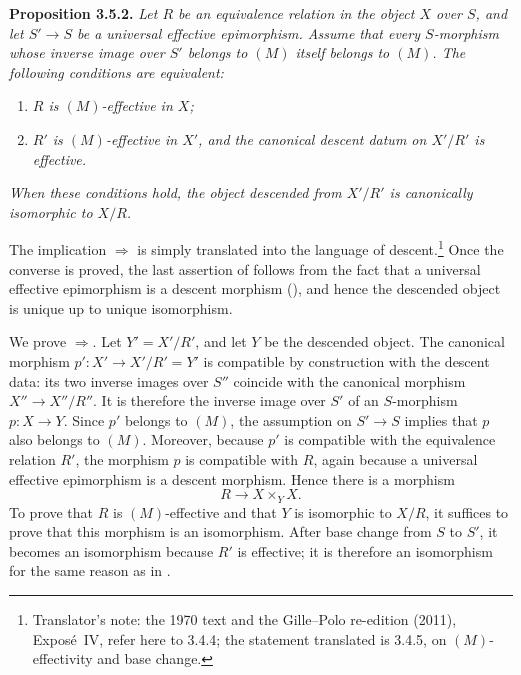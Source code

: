 \medskip
\noindent{}\textbf{Proposition 3.5.2.}
\textit{Let \(R\) be an equivalence relation in the object \(X\) over
\(S\), and let \(S'\to S\) be a universal effective epimorphism. Assume
that every \(S\)-morphism whose inverse image over \(S'\) belongs to
\((M)\) itself belongs to \((M)\). The following conditions are equivalent:}
\begin{enumerate}
  \item[(i)] \textit{\(R\) is \((M)\)-effective in \(X\);}
  \item[(ii)] \textit{\(R'\) is \((M)\)-effective in \(X'\), and the
  canonical descent datum on \(X'/R'\) is effective.}
\end{enumerate}
\textit{When these conditions hold, the object descended from \(X'/R'\) is
canonically isomorphic to \(X/R\).}

The implication \(\Rightarrow\) is simply  translated into the
language of descent.\footnote{Translator's note: the 1970 text and the Gille--Polo
re-edition (2011), Expos\'e~IV, refer here to 3.4.4; the statement translated
is 3.4.5, on \((M)\)-effectivity and base change.} Once the converse is proved, the last assertion of  follows from the fact that a universal effective epimorphism is
a descent morphism (), and hence the descended object is unique up to
unique isomorphism.

We prove \(\Rightarrow\). Let \(Y'=X'/R'\), and let \(Y\) be the
descended object. The canonical morphism
\(p':X'\to X'/R'=Y'\) is compatible by construction with the descent data:
its two inverse images over \(S''\) coincide with the canonical morphism
\(X''\to X''/R''\). It is therefore the inverse image over \(S'\) of an
\(S\)-morphism \(p:X\to Y\). Since \(p'\) belongs to \((M)\), the assumption
on \(S'\to S\) implies that \(p\) also belongs to \((M)\). Moreover,
because \(p'\) is compatible with the equivalence relation \(R'\), the
morphism \(p\) is compatible with \(R\), again because a universal
effective epimorphism is a descent morphism. Hence there is a morphism
\[
  R\longrightarrow X\times_YX.
\]
To prove that \(R\) is \((M)\)-effective and that \(Y\) is isomorphic to
\(X/R\), it suffices to prove that this morphism is an isomorphism. After
base change from \(S\) to \(S'\), it becomes an isomorphism because \(R'\)
is effective; it is therefore an isomorphism for the same reason as in .

